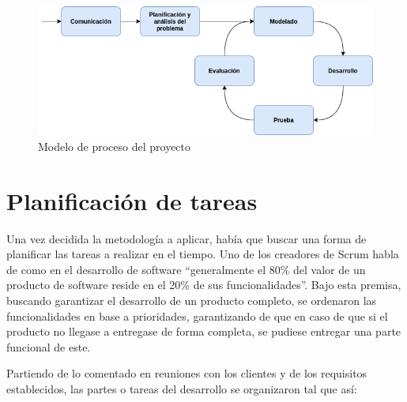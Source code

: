 \begin{figure}[H]
    \centering
    \includegraphics[width=\textwidth]{diseno/modelo_de_proceso.png}
    \caption{Modelo de proceso del proyecto}
    \label{fig:modelo_de_proceso}
\end{figure}

\section{Planificación de tareas}

Una vez decidida la metodología a aplicar, había que buscar una forma de planificar las tareas a realizar en el tiempo. Uno de los creadores de Scrum habla de como en el desarrollo de software ``generalmente el 80\% del valor de un producto de software reside en el 20\% de sus funcionalidades''\cite{sutherland-2014}. Bajo esta premisa, buscando garantizar el desarrollo de un producto completo, se ordenaron las funcionalidades en base a prioridades, garantizando de que en caso de que si el producto no llegase a entregase de forma completa, se pudiese entregar una parte funcional de este.

Partiendo de lo comentado en reuniones con los clientes y de los requisitos establecidos, las partes o tareas del desarrollo se organizaron tal que así: 

